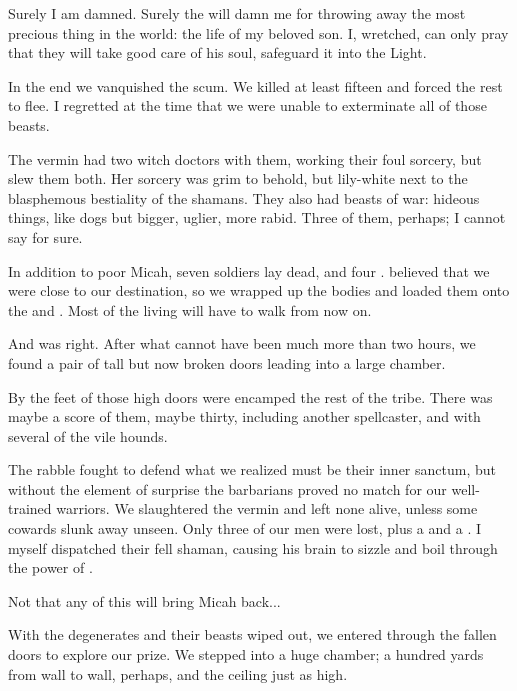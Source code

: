 \begin{diary}
Surely I am damned. 
Surely the \sephiroth{} will damn me for throwing away the most precious thing in the world: 
the life of my beloved son. 
I, wretched, can only pray that they will take good care of his soul, safeguard it into the Light. 

In the end we vanquished the scum. 
We killed at least fifteen and forced the rest to flee. 
I regretted at the time that we were unable to exterminate all of those beasts. 

The vermin had two witch doctors with them, working their foul sorcery, but \Miss{} \Takestsha{} slew them both. 
Her \Rethyactic{} sorcery was grim to behold, but lily-white next to the blasphemous bestiality of the \EreshKali{} shamans. 
They also had beasts of war: hideous things, like dogs but bigger, uglier, more rabid. 
Three of them, perhaps; I cannot say for sure. 

In addition to poor Micah, seven soldiers lay dead, and four \relcs. 
\Takestsha{} believed that we were close to our destination, so we wrapped up the bodies and loaded them onto the \relcs{} and \belwans. 
Most of the living will have to walk from now on. 

And \Takestsha{} was right. 
After what cannot have been much more than two hours, we found a pair of tall but now broken doors leading into a large chamber. 

By the feet of those high doors were encamped the rest of the \meccaran{} tribe. 
There was maybe a score of them, maybe thirty, including another spellcaster, and with several of the vile hounds. 

The rabble fought to defend what we realized must be their inner sanctum, but without the element of surprise the barbarians proved no match for our well-trained warriors. 
We slaughtered the vermin and left none alive, unless some cowards slunk away unseen. 
Only three of our men were lost, plus a \relc{} and a \belwan{}. 
I myself dispatched their fell shaman, causing his brain to sizzle and boil through the power of \Razilah. 

Not that any of this will bring Micah back... 

With the degenerates and their beasts wiped out, we entered through the fallen doors to explore our prize. 
We stepped into a huge chamber; a hundred yards from wall to wall, perhaps, 
and the ceiling just as high. 


\end{diary}
